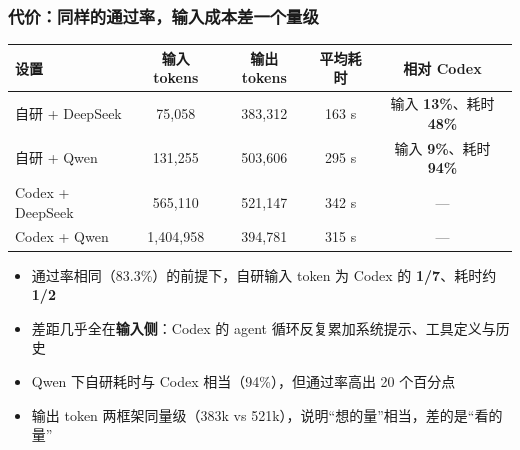 \documentclass[10pt,aspectratio=169]{beamer}
\begin{document}
\begin{frame}
  \frametitle{代价：同样的通过率，输入成本差一个量级}

  \centering
  \small
  \setlength{\tabcolsep}{6pt}
  \renewcommand{\arraystretch}{1.2}
  \begin{tabular}{lcccc}
    \hline
    设置 & 输入 tokens & 输出 tokens & 平均耗时 & 相对 Codex \\
    \hline
    自研 + DeepSeek  & 75,058    & 383,312 & 163 s & 输入 \textbf{13\%}、耗时 \textbf{48\%} \\
    自研 + Qwen      & 131,255   & 503,606 & 295 s & 输入 \textbf{9\%}、耗时 \textbf{94\%} \\
    Codex + DeepSeek & 565,110   & 521,147 & 342 s & --- \\
    Codex + Qwen     & 1,404,958 & 394,781 & 315 s & --- \\
    \hline
  \end{tabular}

  \vspace{2.5mm}
  \begin{itemize}
    \item 通过率相同（83.3\%）的前提下，自研输入 token 为 Codex 的 \textbf{1/7}、耗时约 \textbf{1/2}
    \item 差距几乎全在\textbf{输入侧}：Codex 的 agent 循环反复累加系统提示、工具定义与历史
    \item Qwen 下自研耗时与 Codex 相当（94\%），但通过率高出 20 个百分点
    \item 输出 token 两框架同量级（383k vs 521k），说明“想的量”相当，差的是“看的量”
  \end{itemize}
\end{frame}
\end{document}
